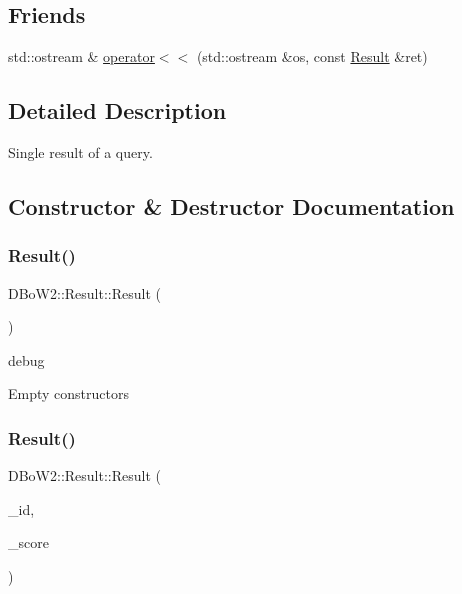\subsection*{Friends}
\begin{DoxyCompactItemize}
\item 
std\+::ostream \& \hyperlink{classDBoW2_1_1Result_adcb074a444887749ca1ce08b25b73a48}{operator$<$$<$} (std\+::ostream \&os, const \hyperlink{classDBoW2_1_1Result}{Result} \&ret)
\end{DoxyCompactItemize}


\subsection{Detailed Description}
Single result of a query. 

\subsection{Constructor \& Destructor Documentation}
\mbox{\label{classDBoW2_1_1Result_a3cd1ea537745f0f76042d08033629f4a}} 
\subsubsection{\texorpdfstring{Result()}{Result()}\hspace{0.1cm}{\footnotesize\ttfamily [1/2]}}
{\footnotesize\ttfamily D\+Bo\+W2\+::\+Result\+::\+Result (\begin{DoxyParamCaption}{ }\end{DoxyParamCaption})\hspace{0.3cm}{\ttfamily [inline]}}



debug 

Empty constructors \mbox{\label{classDBoW2_1_1Result_a5ca2977e7a2646f886ef92cb7f64352a}} 
\subsubsection{\texorpdfstring{Result()}{Result()}\hspace{0.1cm}{\footnotesize\ttfamily [2/2]}}
{\footnotesize\ttfamily D\+Bo\+W2\+::\+Result\+::\+Result (\begin{DoxyParamCaption}\item[{\hyperlink{namespaceDBoW2_a060a36cf320e6e831ee98915c19c1623}{Entry\+Id}}]{\+\_\+id,  }\item[{double}]{\+\_\+score }\end{DoxyParamCaption})\hspace{0.3cm}{\ttfamily [inline]}}

